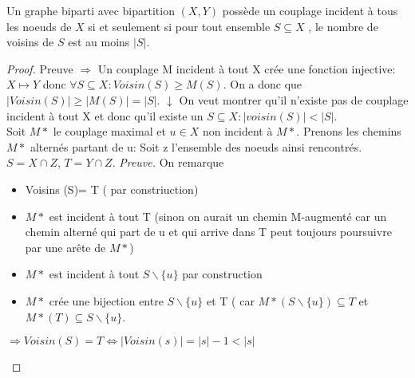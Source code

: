 \begin{mytheo} 
  Un graphe biparti avec bipartition $(X , Y)$ possède un couplage incident à tous les noeuds de $X$ si et seulement si pour tout ensemble $S \subseteq X$ , le nombre de voisins de $S$ est au moins $|S|$.
  \begin{proof}
     Preuve $\Longrightarrow$ Un couplage M incident à tout X crée une fonction injective: $X\mapsto Y$ donc $\forall S \subseteq X: Voisin (S) \geq M(S) $. On a donc que $ |Voisin (S)| \geq |M(S)| = |S| $.
     $\downarrow$ On veut montrer qu'il n'existe pas de couplage incident à tout X et donc qu'il existe un $ S \subseteq X: |voisin (S)| < |S|$. \\
     Soit $M*$ le couplage maximal et $ u \in X$ non incident à $M*$. Prenons les chemins $M*$ alternés partant de u: Soit z l'ensemble des noeuds ainsi rencontrés. $ S = X\cap Z$, $T= Y \cap Z$.
     \textit{Preuve.} On remarque \begin{itemize}
     \item Voisins (S)= T ( par constriuction)
     \item	$M*$ est incident à tout T (sinon on aurait un chemin M-augmenté car un chemin alterné qui part de u et qui arrive dans T peut toujours poursuivre par une arête de $M*$)
     \item $M*$ est incident à tout $S\backslash\lbrace u\rbrace$ par construction
     \item $M*$ crée une bijection entre $S\backslash\lbrace u\rbrace$ et T ( car $M* (S\backslash\lbrace u\rbrace) \subseteq T$ et $M*(T) \subseteq S\backslash\lbrace u\rbrace$.
     \end{itemize}
     $ \Rightarrow  Voisin (S)= T \Longleftrightarrow  |Voisin(s)| = |s|-1 < |s|$

\begin{center}
\end{center}
\end{proof}
\end{mytheo}
